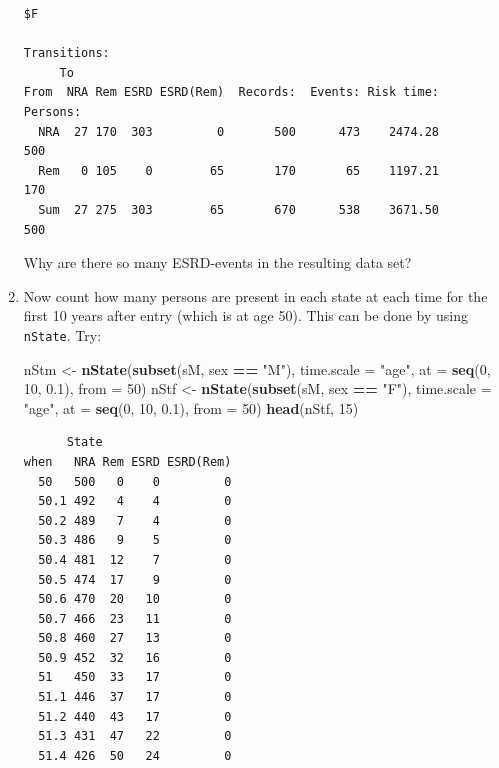 \documentclass[
]{book}
\newenvironment{Shaded}{\begin{snugshade}}{\end{snugshade}}
\newcommand{\AttributeTok}[1]{\textcolor[rgb]{0.13,0.29,0.53}{#1}}
\newcommand{\DecValTok}[1]{\textcolor[rgb]{0.00,0.00,0.81}{#1}}
\newcommand{\FloatTok}[1]{\textcolor[rgb]{0.00,0.00,0.81}{#1}}
\newcommand{\FunctionTok}[1]{\textcolor[rgb]{0.13,0.29,0.53}{\textbf{#1}}}
\newcommand{\NormalTok}[1]{#1}
\newcommand{\OtherTok}[1]{\textcolor[rgb]{0.56,0.35,0.01}{#1}}
\newcommand{\SpecialCharTok}[1]{\textcolor[rgb]{0.81,0.36,0.00}{\textbf{#1}}}
\newcommand{\StringTok}[1]{\textcolor[rgb]{0.31,0.60,0.02}{#1}}
\begin{document}
\begin{enumerate}
\begin{verbatim}
$F

Transitions:
     To
From  NRA Rem ESRD ESRD(Rem)  Records:  Events: Risk time:  Persons:
  NRA  27 170  303         0       500      473    2474.28       500
  Rem   0 105    0        65       170       65    1197.21       170
  Sum  27 275  303        65       670      538    3671.50       500
\end{verbatim}

  Why are there so many ESRD-events in the resulting data set?
\item
  Now count how many persons are present in each state
  at each time for the first 10 years after entry (which is at age 50). This
  can be done by using \texttt{nState}. Try:

\begin{Shaded}
\begin{Highlighting}[]
\NormalTok{nStm }\OtherTok{\textless{}{-}} \FunctionTok{nState}\NormalTok{(}\FunctionTok{subset}\NormalTok{(sM, sex }\SpecialCharTok{==} \StringTok{"M"}\NormalTok{), }\AttributeTok{time.scale =} \StringTok{"age"}\NormalTok{, }
               \AttributeTok{at =} \FunctionTok{seq}\NormalTok{(}\DecValTok{0}\NormalTok{, }\DecValTok{10}\NormalTok{, }\FloatTok{0.1}\NormalTok{), }
             \AttributeTok{from =} \DecValTok{50}\NormalTok{)}
\NormalTok{nStf }\OtherTok{\textless{}{-}} \FunctionTok{nState}\NormalTok{(}\FunctionTok{subset}\NormalTok{(sM, sex }\SpecialCharTok{==} \StringTok{"F"}\NormalTok{), }\AttributeTok{time.scale =} \StringTok{"age"}\NormalTok{, }
               \AttributeTok{at =} \FunctionTok{seq}\NormalTok{(}\DecValTok{0}\NormalTok{, }\DecValTok{10}\NormalTok{, }\FloatTok{0.1}\NormalTok{), }
             \AttributeTok{from =} \DecValTok{50}\NormalTok{)}
\FunctionTok{head}\NormalTok{(nStf, }\DecValTok{15}\NormalTok{)}
\end{Highlighting}
\end{Shaded}

\begin{verbatim}
      State
when   NRA Rem ESRD ESRD(Rem)
  50   500   0    0         0
  50.1 492   4    4         0
  50.2 489   7    4         0
  50.3 486   9    5         0
  50.4 481  12    7         0
  50.5 474  17    9         0
  50.6 470  20   10         0
  50.7 466  23   11         0
  50.8 460  27   13         0
  50.9 452  32   16         0
  51   450  33   17         0
  51.1 446  37   17         0
  51.2 440  43   17         0
  51.3 431  47   22         0
  51.4 426  50   24         0
\end{verbatim}


\end{enumerate}
\end{document}
